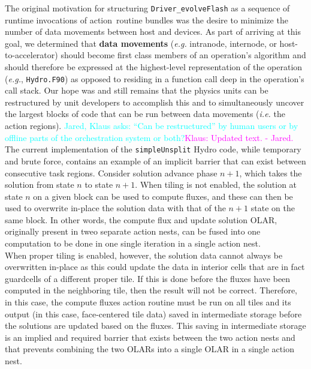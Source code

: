 \documentclass{article}
\newcommand{\eg}{\textit{e.g.}}   %
\newcommand{\JaredQfromKW}[1]   {\textcolor{cyan}{Jared, Klaus asks: #1}}
\newcommand{\KlausRfromJO}[1]   {\textcolor{magenta}{Klaus: #1 - Jared.}}
\newcommand{\shortOLAR}  {OLAR\xspace}
\newcommand{\shortOLARs} {OLARs\xspace}
\newcommand{\OLAR}   {\shortOLAR}             %
\newcommand{\OLARs}  {\shortOLARs}             %
\newcommand{\tileloopnest}           {tile-loop nest\xspace}   %
\newcommand{\actionnest}             {action nest\xspace}      %
\newcommand{\actionnests}            {action nests\xspace}      %
\newcommand{\qsaa}                   {action\ }                 %
\newcommand{\actionroutinebundles} {\qsaa routine bundles\xspace} %
\newcommand{\actionroutine}        {action routine\xspace}       %
\begin{document}
The original motivation for structuring \texttt{Driver\_evolveFlash} as a
sequence of runtime invocations of \actionroutinebundles was the desire to minimize the
number of data movements between host and devices.  As part of arriving at this
goal, we determined that \textbf{data movements} (\textit{e.g.} intranode,
internode, or host-to-accelerator) should become first class members of an
operation's algorithm and should therefore be expressed at the highest-level
representation of the operation (\eg, \texttt{Hydro.F90}) as opposed
to residing in a function call deep in the operation's call stack.  Our hope was and still
remains that the physics units can be restructured by unit developers to accomplish this and to
simultaneously uncover the largest blocks of code that can be run between data
movements (\textit{i.e.} the action regions).
\JaredQfromKW{``Can be restructured'' by human users or by offline parts of the
orchestration system or both?}\KlausRfromJO{Updated text.}
\\

The current implementation of the \texttt{simpleUnsplit} Hydro code, while temporary and
brute force, contains an example of an implicit barrier that can exist between
consecutive task regions.
Consider solution advance phase $n+1$, which takes the solution from state $n$ to state $n+1$.
When tiling is not enabled, the solution at state $n$ on
a given block can be used to compute fluxes, and these can then be used to overwrite in-place
the solution data with that of the $n+1$ state on the same block.  In other
words, the compute flux and update solution \OLAR, originally present in
tweo separate \actionnests, can be fused into one
computation to be done in one single iteration in a single \actionnest.\\

When proper tiling is enabled, however, the solution data cannot always be overwritten
in-place as this could update the data in interior cells that are in fact
guardcells of a different proper tile.  If this is done before the fluxes have been
computed in the neighboring tile, then the result will not be correct.
Therefore, in this case, the compute fluxes \actionroutine must be run on all tiles and
its output (in this case, face-centered tile data) saved in intermediate storage before the solutions are updated based on the
fluxes.
This saving in intermediate storage is an implied and required barrier that exists between
the two \actionnests and that prevents combining the two \OLARs into a single
\OLAR in a single \actionnest.\\
\end{document}
